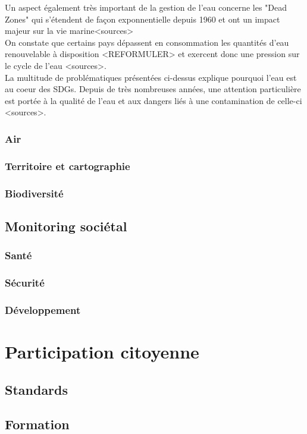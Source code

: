 \documentclass[10pt, conference, compsocconf]{llncs}
\begin{document}
		Un aspect également très important de la gestion de l'eau concerne les "Dead Zones" qui s'étendent de façon exponnentielle depuis 1960 et ont un impact majeur sur la vie marine<sources> \\
		On constate que certains pays dépassent en consommation les quantités d'eau renouvelable à disposition <REFORMULER> et exercent donc une pression sur le cycle de l'eau <sources>. \\
		La multitude de problématiques présentées ci-dessus explique pourquoi l'eau est au coeur des SDGs. Depuis de très nombreuses années, une attention particulière est portée à la qualité de l'eau et aux dangers liés à une contamination de celle-ci <sources>.
		\subsubsection{Air}
		\subsubsection{Territoire et cartographie}
		\subsubsection{Biodiversité}
	
	\subsection{Monitoring sociétal}
		\subsubsection{Santé}
		\subsubsection{Sécurité}
		\subsubsection{Développement}

\section{Participation citoyenne}
	\subsection{Standards}
	\subsection{Formation}
\end{document}
